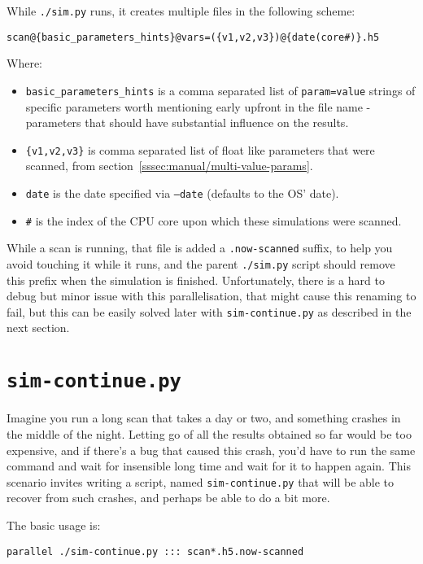 While \texttt{./sim.py} runs, it creates multiple files in the following scheme:
	
\begin{verbatim}
scan@{basic_parameters_hints}@vars=({v1,v2,v3})@{date(core#)}.h5
\end{verbatim}

Where:

\begin{itemize}
	\item \texttt{basic\_parameters\_hints} is a comma separated list of \texttt{param=value} strings of specific parameters worth mentioning early upfront in the file name - parameters that should have substantial influence on the results. 
	\item \texttt{\{v1,v2,v3\}} is comma separated list of float like parameters that were scanned, from section~\ref{sssec:manual/multi-value-params}.
	\item \texttt{date} is the date specified via \texttt{--date} (defaults to the OS' date).
	\item \texttt{\#} is the index of the CPU core upon which these simulations were scanned.
\end{itemize}

While a scan is running, that file is added a \texttt{.now-scanned} suffix, to help you avoid touching it while it runs, and the parent \texttt{./sim.py} script should remove this prefix when the simulation is finished. Unfortunately, there is a hard to debug but minor issue with this parallelisation, that might cause this renaming to fail, but this can be easily solved later with \texttt{sim-continue.py} as described in the next section.

\section{\texttt{sim-continue.py}}\label{ssec:sim-continue}

Imagine you run a long scan that takes a day or two, and something crashes in the middle of the night. Letting go of all the results obtained so far would be too expensive, and if there's a bug that caused this crash, you'd have to run the same command and wait for insensible long time and wait for it to happen again. This scenario invites writing a script, named \texttt{sim-continue.py} that will be able to recover from such crashes, and perhaps be able to do a bit more.

The basic usage is:

\begin{verbatim}
parallel ./sim-continue.py ::: scan*.h5.now-scanned
\end{verbatim}


